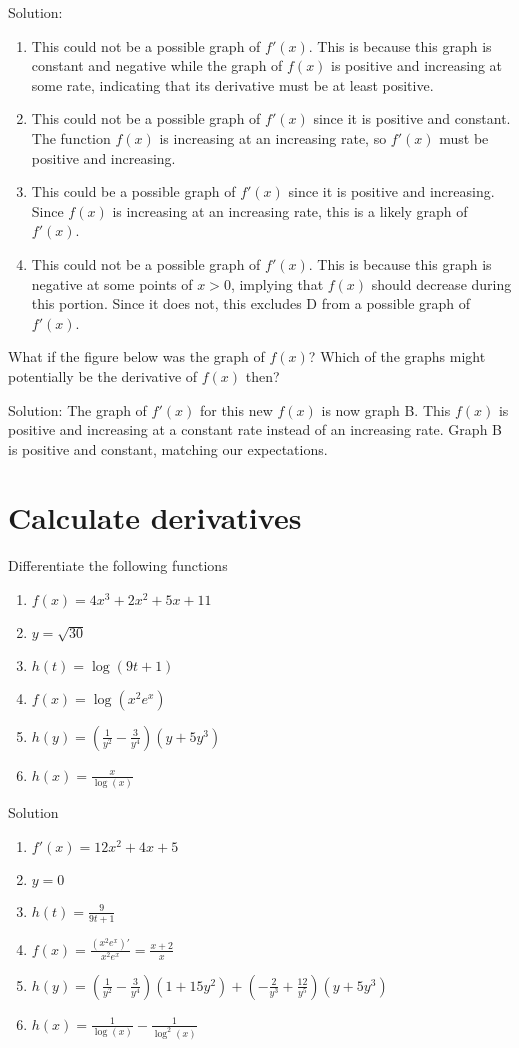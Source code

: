 \documentclass[12pt]{article}
\begin{document}
Solution:
\begin{enumerate}
    \item This could not be a possible graph of $f'(x)$. This is because this graph is constant and negative while the graph of $f(x)$ is positive and increasing at some rate, indicating that its derivative must be at least positive. 
    \item This could not be a possible graph of $f'(x)$ since it is positive and constant. The function $f(x)$ is increasing at an increasing rate, so $f'(x)$ must be positive and increasing.
    \item This could be a possible graph of $f'(x)$ since it is positive and increasing. Since $f(x)$ is increasing at an increasing rate,  this is a likely graph of $f'(x)$.
    \item This could not be a possible graph of $f'(x)$. This is because this graph is negative at some points of $x>0$, implying that $f(x)$ should decrease during this portion. Since it does not, this excludes D from a possible graph of $f'(x)$.
\end{enumerate}
What if the figure below was the graph of $f(x)$? Which of the graphs might potentially be the
derivative of $f(x)$ then?

Solution: The graph of $f'(x)$ for this new $f(x)$ is now graph B. This $f(x)$ is positive and increasing at a constant rate instead of an increasing rate. Graph B is positive and constant, matching our expectations. 

\section{Calculate derivatives}
Differentiate the following functions
\begin{enumerate}
    \item $f(x) = 4x^3 + 2x^2 + 5x + 11$
    \item $y=\sqrt{30}$
    \item $h(t) = \log(9t+1)$
    \item $f(x) = \log(x^2e^x)$
    \item $h(y) = \left(\frac{1}{y^2} - \frac{3}{y^4}\right)(y+5y^3)$
    \item $h(x) = \frac{x}{\log(x)}$
\end{enumerate}
Solution
\begin{enumerate}
    \item $f'(x) = 12x^2 + 4x + 5$
    \item $y=0$
    \item $h(t) = \frac{9}{9t+1}$
    \item $f(x) = \frac{(x^2e^x)'}{x^2e^x} = \frac{x + 2}{x}$
    \item $h(y) = \left(\frac{1}{y^2} - \frac{3}{y^4}\right)(1+15y^2)  +\left(-\frac{2}{y^3} + \frac{12}{y^5}\right) (y+5y^3)$
    \item $h(x) = \frac{1}{\log(x)} - \frac{1}{\log^2(x)}$
\end{enumerate}
\end{document}
